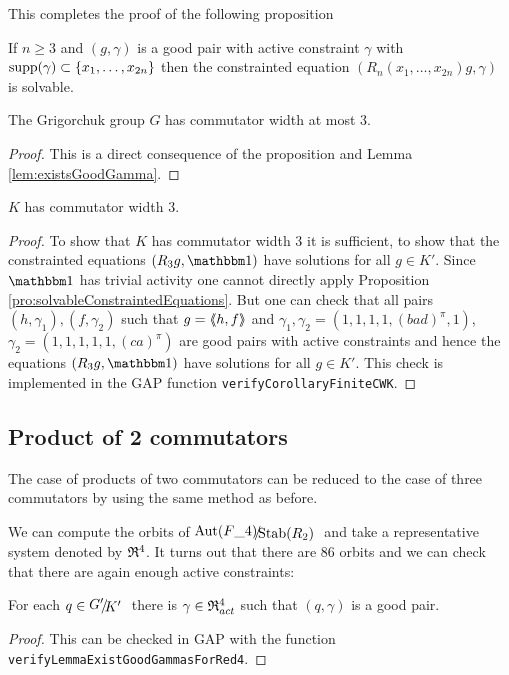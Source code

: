 \documentclass[a4paper,11pt]{amsart}
\begin{document}
This completes the proof of the following proposition
\begin{pro}\label{pro:solvableConstraintedEquations}
 If $n\geq3$ and $(g,\gamma)$ is a good pair with active constraint $\gamma$ with $\textup{supp}(\gamma)\subset\{x_1,\ldots,x_{2n}\}$
 then the constrainted equation $(R_n(x_1,\ldots,x_{2n})g,\gamma)$ is solvable. 
\end{pro}
\begin{cor}
 The Grigorchuk group $G$ has commutator width at most $3$.
\end{cor}
\begin{proof}
 This is a direct consequence of the proposition and Lemma \ref{lem:existsGoodGamma}.
\end{proof}


\begin{cor}
 $K$ has commutator width $3$. 
\end{cor}
\begin{proof}
 To show that $K$ has commutator width $3$ it is sufficient, to show that the constrainted equations $(R_3g,\id)$ have solutions for all $g\in K'$. 
 Since $\id$ has trivial activity one cannot directly apply Proposition \ref{pro:solvableConstraintedEquations}.
 But one can check that all pairs $(h,\gamma_1),(f,\gamma_2)$
 such that $g=\langle\negthickspace\langle h,f\rangle\negthickspace\rangle$ and $\gamma_1,\gamma_2=(1,1,1,1,(bad)^\pi,1)$, $\gamma_2=(1,1,1,1,1,(ca)^\pi)$
 are good pairs with active constraints and hence the equations $(R_3g,\id)$ have solutions for all $g\in K'$. 
 This check is implemented in the GAP function \lstinline{verifyCorollaryFiniteCWK}. 
\end{proof}

\subsection{Product of 2 commutators}
The case of products of two commutators can be reduced to the case of three commutators by using the same method as before.

We can compute the orbits of $\RNK{\Aut(F\_4)}{\Stab(R_2)}$ and take a representative system denoted by $\mathfrak{R}^4$.
It turns out that there are $86$ orbits and we can check that there are again enough active constraints:
\begin{lem} \label{lem:existsGoodGammaForRed4}
 For each $q\in\RNK{G'}{K'}$ there is $\gamma\in \mathfrak{R}^4_{act}$ such that $(q,\gamma)$ is a 
 good pair.
\end{lem}
\begin{proof}
 This can be checked in GAP with the function \lstinline{verifyLemmaExistGoodGammasForRed4}.
\end{proof}
\end{document}
